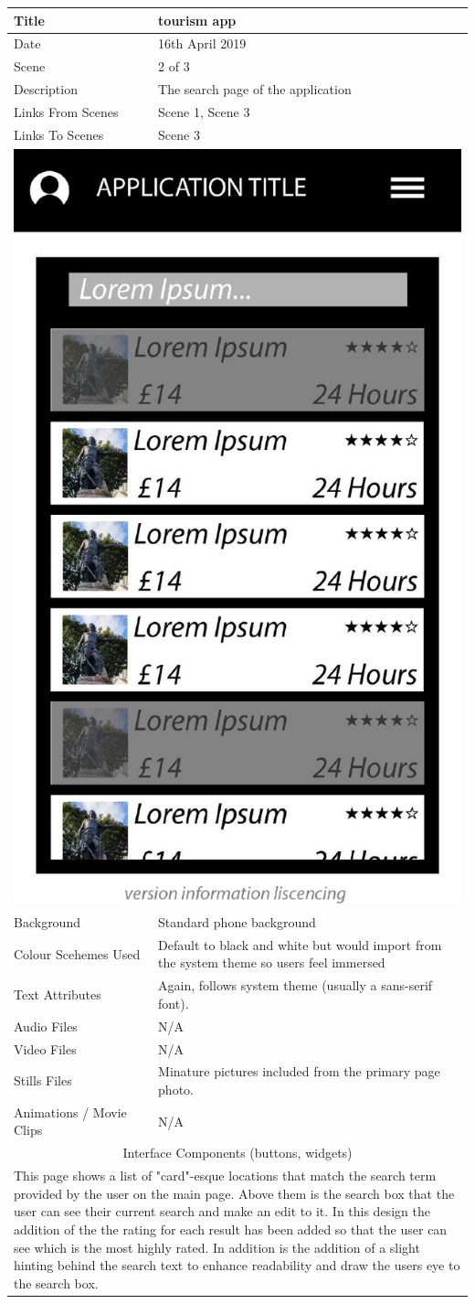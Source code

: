\hspace{-1cm}
	\begin{tabular}{p{4cm}p{10cm}}
		\hline
		Title & tourism app \\
		\hline
		Date & 16th April 2019 \\
		\hline
		Scene & 2 of 3 \\
		\hline
		Description & The search page of the application \\
		\hline
		Links From Scenes & Scene 1, Scene 3 \\
		\hline
		Links To Scenes & Scene 3 \\
		\hline
		\multicolumn{2}{c}{\includegraphics[width=0.5\linewidth]{images/screen1-1.jpg}} \\
		\hline
		Background & Standard phone background \\
		\hline
		Colour Scehemes Used & Default to black and white but would import from the system theme so users feel immersed \\
		\hline
		Text Attributes & Again, follows system theme (usually a sans-serif font). \\
		\hline
		Audio Files & N/A \\
		\hline
		Video Files & N/A \\
		\hline
		Stills Files & Minature pictures included from the primary page photo. \\
		\hline
		Animations / Movie Clips & N/A \\
		\hline
		\multicolumn{2}{c}{Interface Components (buttons, widgets)} \\
		\hline
		\multicolumn{2}{p{14cm}}{ This page shows a list of "card"-esque locations that match the search term provided by the user on the main page. Above them is the search box that the user can see their current search and make an edit to it. In this design the addition of the the rating for each result has been added so that the user can see which is the most highly rated. In addition is the addition of a slight hinting behind the search text to enhance readability and draw the users eye to the search box. } \\
		\hline
	\end{tabular}
